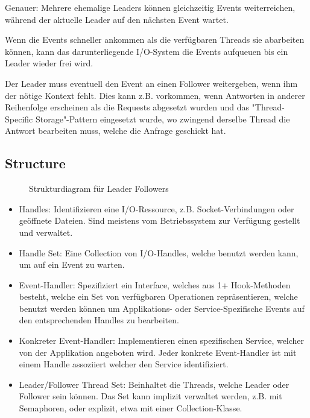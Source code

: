 Genauer: Mehrere ehemalige Leaders können gleichzeitig Events weiterreichen, während der aktuelle Leader auf den nächsten Event wartet.

Wenn die Events schneller ankommen als die verfügbaren Threads sie abarbeiten können, kann das darunterliegende I/O-System die Events aufqueuen bis ein Leader wieder frei wird.

Der Leader muss eventuell den Event an einen Follower weitergeben, wenn ihm der nötige Kontext fehlt. Dies kann z.B. vorkommen, wenn Antworten in anderer Reihenfolge erscheinen als die Requests abgesetzt wurden und das "Thread-Specific Storage"-Pattern eingesetzt wurde, wo zwingend derselbe Thread die Antwort bearbeiten muss, welche die Anfrage geschickt hat.
\subsection{Structure}
\begin{figure}[H]
  \centering
  
  \caption{Strukturdiagram f\"ur Leader Followers}
\end{figure}
\begin{itemize}
  \item Handles: Identifizieren eine I/O-Ressource, z.B. Socket-Verbindungen oder geöffnete Dateien. Sind meistens vom Betriebssystem zur Verfügung gestellt und verwaltet.
  \item Handle Set: Eine Collection von I/O-Handles, welche benutzt werden kann, um auf ein Event zu warten.
  \item Event-Handler: Spezifiziert ein Interface, welches aus 1+ Hook-Methoden besteht, welche ein Set von verfügbaren Operationen repräsentieren, welche benutzt werden können um Applikations- oder Service-Spezifische Events auf den entsprechenden Handles zu bearbeiten.
  \item Konkreter Event-Handler: Implementieren einen spezifischen Service, welcher von der Applikation angeboten wird. Jeder konkrete Event-Handler ist mit einem Handle assoziiert welcher den Service identifiziert.
  \item Leader/Follower Thread Set: Beinhaltet die Threads, welche Leader oder Follower sein können. Das Set kann implizit verwaltet werden, z.B. mit Semaphoren, oder explizit, etwa mit einer Collection-Klasse.
\end{itemize}

